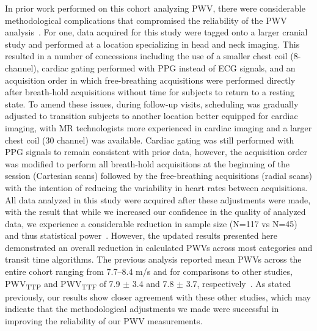 In prior work performed on this cohort analyzing PWV, there were considerable methodological complications that compromised the reliability of the PWV analysis~\cite{robertsAdvancingFunctionalAssessment2023}. For one, data acquired for this study were tagged onto a larger cranial study and performed at a location specializing in head and neck imaging. This resulted in a number of concessions including the use of a smaller chest coil (8-channel), cardiac gating performed with PPG instead of ECG signals, and an acquisition order in which free-breathing acquisitions were performed directly after breath-hold acquisitions without time for subjects to return to a resting state. To amend these issues, during follow-up visits, scheduling was gradually adjusted to transition subjects to another location better equipped for cardiac imaging, with MR technologists more experienced in cardiac imaging and a larger chest coil (30 channel) was available. Cardiac gating was still performed with PPG signals to remain consistent with prior data, however, the acquisition order was modified to perform all breath-hold acquisitions at the beginning of the session (Cartesian scans) followed by the free-breathing acquisitions (radial scans) with the intention of reducing the variability in heart rates between acquisitions. All data analyzed in this study were acquired after these adjustments were made, with the result that while we increased our confidence in the quality of analyzed data, we experience a considerable reduction in sample size (N=117 vs N=45) and thus statistical power~\cite{robertsAdvancingFunctionalAssessment2023}. However, the updated results presented here demonstrated an overall reduction in calculated PWVs across most categories and transit time algorithms. The previous analysis reported mean PWVs across the entire cohort ranging from 7.7--8.4 m/s and for comparisons to other studies, PWV\textsubscript{TTP} and PWV\textsubscript{TTF} of 7.9 $\pm$ 3.4 and 7.8 $\pm$ 3.7, respectively~\cite{robertsAdvancingFunctionalAssessment2023}. As stated previously, our results show closer agreement with these other studies, which may indicate that the methodological adjustments we made were successful in improving the reliability of our PWV measurements.

